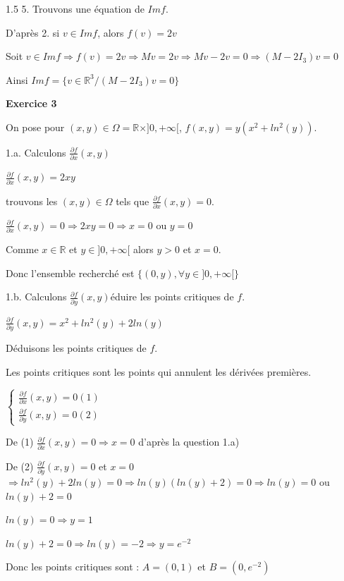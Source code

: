 \documentclass[12pt]{article}
\begin{document}
\begin{spacing}{1.5}
5. Trouvons une équation de $Imf$.

D'après 2. si $v\in Imf$, alors $f(v)=2v$

Soit $v\in Imf\Longrightarrow f(v)=2v\Longrightarrow Mv=2v\Longrightarrow Mv-2v=0\Longrightarrow (M-2I_3)v=0$

Ainsi $Imf=\{v\in \mathbb{R}^3/(M-2I_3)v=0\}$

\medskip
\textbf{Exercice 3}

On pose pour $(x,y)\in\Omega=\mathbb{R}\times]0,+\infty[$,  $f(x,y)=y(x^2 + ln^2{(y)})$.

1.a. Calculons $\frac{\partial{f}}{\partial{x}}(x,y)$ 

$\frac{\partial{f}}{\partial{x}}(x,y)=2xy$

\medskip
trouvons les $(x,y)\in\Omega$ tels que $\frac{\partial{f}}{\partial{x}}(x,y) = 0$.

$\frac{\partial{f}}{\partial{x}}(x,y) = 0\Rightarrow 2xy=0\Rightarrow x=0$ ou $y=0$

Comme $x\in\mathbb{R}$ et $y\in ]0,+\infty[$ alors $y>0$ et $x=0$.

Donc l'ensemble recherché est $\{(0,y), \forall y\in ]0,+\infty[\}$


1.b. Calculons $\frac{\partial{f}}{\partial{y}}(x,y)$éduire les points critiques de $f$.

$\frac{\partial{f}}{\partial{y}}(x,y)=x^2 + ln^2{(y)}+2ln(y)$

\medskip
Déduisons les points critiques de $f$.

Les points critiques sont les points qui annulent les dérivées premières.

$\begin{cases}
\frac{\partial{f}}{\partial{x}}(x,y) = 0 (1)\\
\frac{\partial{f}}{\partial{y}}(x,y) = 0 (2)
\end{cases}$

De (1) $\frac{\partial{f}}{\partial{x}}(x,y) = 0\Longrightarrow x=0$ d'après la question 1.a)

De (2) $\frac{\partial{f}}{\partial{y}}(x,y) = 0$ et $x=0$ $\Rightarrow ln^2{(y)}+2ln(y)=0\Rightarrow ln(y)(ln(y)+2)=0\Rightarrow ln(y)=0$ ou $ln(y)+2=0$

$ln(y)=0\Rightarrow y=1$

$ln(y)+2=0\Rightarrow ln(y)=-2\Rightarrow y=e^{-2}$

Donc les points critiques sont : $A=(0,1)$ et $B=(0,e^{-2})$




\end{spacing}
\end{document}
